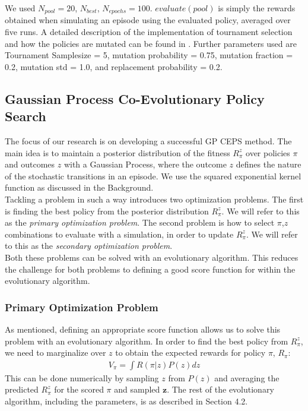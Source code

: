 We used $N_{pool} = 20$, $N_{best}$, $N_{epochs} = 100$. $evaluate(pool)$ is simply the rewards obtained when simulating an episode using the evaluated policy, averaged over five runs.  
A detailed description of the implementation of tournament selection and how the policies are mutated can be found in \cite{koppejan2011neuroevolutionary}. Further parameters used are Tournament Samplesize = 5, mutation probability = 0.75, mutation fraction = 0.2, mutation std = 1.0, and replacement probability = 0.2. 

\subsection{Gaussian Process Co-Evolutionary Policy Search}

The focus of our research is on developing a successful GP CEPS method. The main idea is to maintain a posterior distribution of the fitness $R_{\pi}^z$ over policies $\pi$ and outcomes $z$ with a Gaussian Process, where the outcome $z$ defines the nature of the stochastic transitions in an episode. We use the squared exponential kernel function as discussed in the Background. \\
Tackling a problem in such a way introduces two optimization problems. The first is finding the best policy from the posterior distribution $R_{\pi}^z$. We will refer to this as the \textit{primary optimization problem}. The second problem is how to select $\pi$,$z$ combinations to evaluate with a simulation, in order to update $R_{\pi}^z$. We will refer to this as the \textit{secondary optimization problem}. \\
Both these problems can be solved with an evolutionary algorithm. This reduces the challenge for both problems to defining a good score function for within the evolutionary algorithm.

\subsubsection{Primary Optimization Problem}

As mentioned, defining an appropriate score function allows us to solve this problem with an evolutionary algorithm. In order to find the best policy from $R_{\pi}^z$, we need to marginalize over $z$ to obtain the expected rewards for policy $\pi$, $R_{\pi}$: 
\begin{align}
V_{\pi} = \int R(\pi | z) P(z)dz 
\end{align}
This can be done numerically by sampling $z$ from $P(z)$ and averaging the predicted $R_{\pi}^z$ for the scored $\pi$ and sampled $\mathbf{z}$. The rest of the evolutionary algorithm, including the parameters, is as described in Section 4.2.

